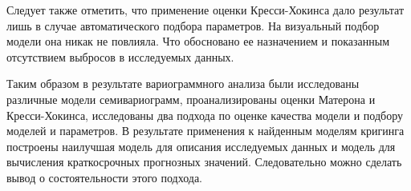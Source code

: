 

Следует также отметить, что применение оценки Кресси-Хокинса дало результат лишь в случае автоматического подбора параметров. На визуальный подбор модели она никак не повлияла. Что обосновано ее назначением и показанным отсутствием выбросов в исследуемых данных.

Таким образом в результате вариограммного анализа были исследованы различные модели семивариограмм, проанализированы оценки Матерона и Кресси-Хокинса, исследованы два подхода по оценке качества модели и подбору моделей и параметров. В результате применения к найденным моделям кригинга построены наилучшая модель для описания исследуемых данных и модель для вычисления краткосрочных прогнозных значений. Следовательно можно сделать вывод о состоятельности этого подхода.


